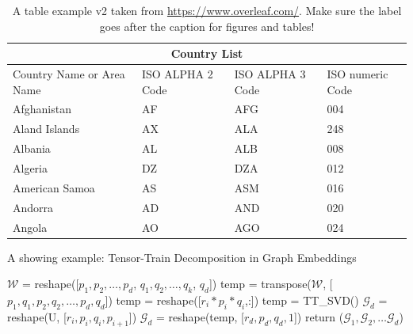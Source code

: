 \begin{table}
	\begin{center}
\begin{tabular}{ |p{3cm}||p{3cm}|p{3cm}|p{3cm}|  }
	\hline
	\multicolumn{4}{|c|}{Country List} \\
	\hline
	Country Name     or Area Name& ISO ALPHA 2 Code &ISO ALPHA 3 Code&ISO numeric Code\\
	\hline
	Afghanistan   & AF    &AFG&   004\\
	Aland Islands&   AX  & ALA   &248\\
	Albania &AL & ALB&  008\\
	Algeria    &DZ & DZA&  012\\
	American Samoa&   AS  & ASM&016\\
	Andorra& AD  & AND   &020\\
	Angola& AO  & AGO&024\\
	\hline
\end{tabular}
\caption{A table example v2 taken from \url{https://www.overleaf.com/}. Make sure the label goes after the caption for figures and tables!}
\label{tab:table_ex2}
\end{center}	
\end{table}


\begin{algorithm} [t]
\footnotesize
  \SetAlgoLined
  \DontPrintSemicolon
  \caption{A showing example: Tensor-Train Decomposition in Graph Embeddings}
  $\mathcal{W}$ = reshape([$p_1, p_2, \dots, p_d$, $q_1, q_2, \dots, q_k$, $q_d$]) \;
  temp = transpose($\mathcal{W}$, [$p_1, q_1, p_2, q_2, \dots, p_d, q_d$]) \;
   {
    temp = reshape([$r_i * p_i * q_i$,:]) \;
    temp = TT\_SVD() \; 
    $\mathcal{G}_d$ = reshape(U, [$r_i, p_i, q_i, p_{i+1}$]) \;
  }
  $\mathcal{G}_d$ = reshape(temp, [$r_d, p_d, q_d, 1$]) \;
  return ($\mathcal{G}_1, \mathcal{G}_2, \dots \mathcal{G}_d$) \;
  \label{alg:example}
\end{algorithm}










